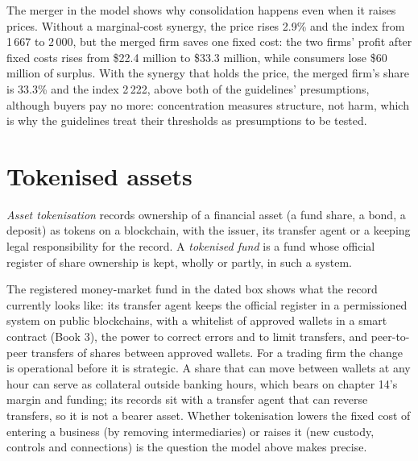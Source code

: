 \label{lst:fm:competition-and-the-future:merge}

The merger in the model shows why consolidation happens even when it raises prices. Without a marginal-cost synergy, the price rises 2.9\% and the
index from 1\,667 to 2\,000, but the merged firm saves one fixed cost: the two firms' profit after fixed costs rises from \$22.4 million to \$33.3
million, while consumers lose \$60 million of surplus. With the synergy that holds the price, the merged firm's share is 33.3\% and the index 2\,222,
above both of the guidelines' presumptions, although buyers pay no more: concentration measures structure, not harm, which is why the guidelines
treat their thresholds as presumptions to be tested.

\section{Tokenised assets}

\begin{definition}\label{def:fm:competition-and-the-future:token}
\emph{Asset tokenisation} records ownership of a financial asset (a fund share, a bond, a deposit) as tokens on a
blockchain, with the issuer, its transfer agent or a  keeping legal responsibility for the record. A \emph{tokenised fund} is a fund whose official register of share ownership is kept, wholly or partly, in such a system.
\end{definition}

The registered money-market fund in the dated box shows what the record currently looks like: its transfer agent keeps the official register in a
permissioned system on public blockchains, with a whitelist of approved wallets in a smart contract (Book 3), the power to correct errors and to limit
transfers, and peer-to-peer transfers of shares between approved wallets. For a trading firm the change is operational before it is strategic. A
share that can move between wallets at any hour can serve as collateral outside banking hours, which bears on chapter 14's margin and funding; its
records sit with a transfer agent that can reverse transfers, so it is not a bearer asset. Whether tokenisation lowers the fixed cost of entering a
business (by removing intermediaries) or raises it (new custody, controls and connections) is the question the model above makes precise.

